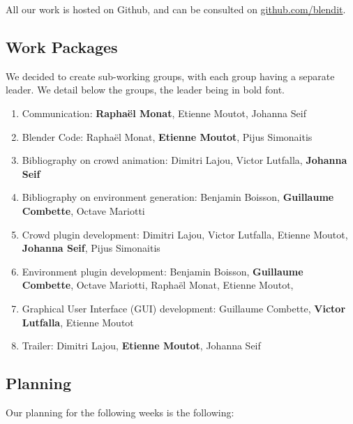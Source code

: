 \documentclass[a4paper,11pt]{article}
\newcommand\bb{Benjamin Boisson}
\newcommand\gc{Guillaume Combette}
\newcommand\dl{Dimitri Lajou}
\newcommand\vl{Victor Lutfalla}
\newcommand\om{Octave Mariotti}
\newcommand\mr{Raphaël Monat} %
\newcommand\me{Etienne Moutot} %
\newcommand\js{Johanna Seif}
\newcommand\ps{Pijus Simonaitis}
\begin{document}
All our work is hosted on Github, and can be consulted on \url{github.com/blendit}.

\subsection{Work Packages}
We decided to create sub-working groups, with each group having a separate leader. We detail below the groups, the leader being in bold font.

\begin{enumerate}[label=WP\arabic*:, start=0]
\item Communication: \textbf{\mr}, \me, \js
\item Blender Code: \mr, \textbf{\me}, \ps
\item Bibliography on crowd animation: \dl, \vl, \textbf{\js}
\item Bibliography on environment generation: \bb, \textbf{\gc}, \om
\item Crowd plugin development: \dl, \vl, \me, \textbf{\js}, \ps
\item Environment plugin development: \bb, \textbf{\gc}, \om, \mr, \me,
\item Graphical User Interface (GUI) development: \gc, \textbf{\vl}, \me
\item Trailer: \dl, \textbf{\me}, \js
\end{enumerate}

\subsection{Planning}

Our planning for the following weeks is the following:
\end{document}
